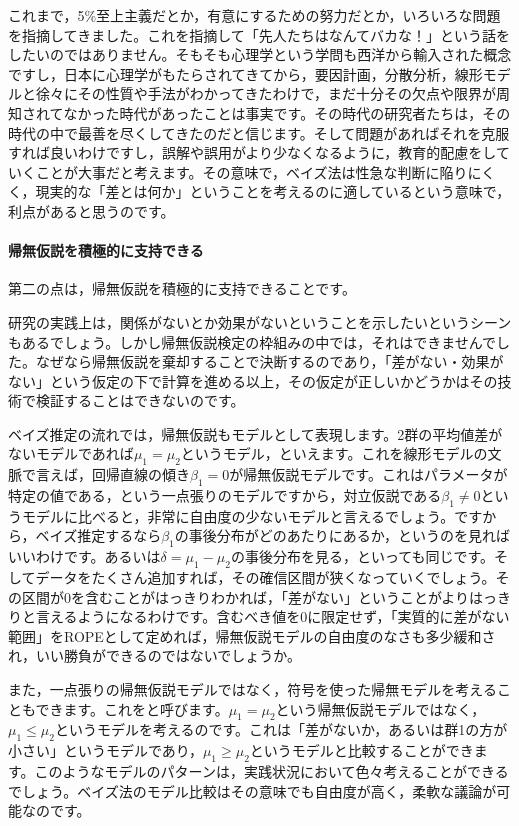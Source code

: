 \documentclass{ltjbook}
\begin{document}
これまで，5\%至上主義だとか，有意にするための努力だとか，いろいろな問題を指摘してきました。これを指摘して「先人たちはなんてバカな！」という話をしたいのではありません。そもそも心理学という学問も西洋から輸入された概念ですし，日本に心理学がもたらされてきてから，要因計画，分散分析，線形モデルと徐々にその性質や手法がわかってきたわけで，まだ十分その欠点や限界が周知されてなかった時代があったことは事実です。その時代の研究者たちは，その時代の中で最善を尽くしてきたのだと信じます。そして問題があればそれを克服すれば良いわけですし，誤解や誤用がより少なくなるように，教育的配慮をしていくことが大事だと考えます。その意味で，ベイズ法は性急な判断に陥りにくく，現実的な「差とは何か」ということを考えるのに適しているという意味で，利点があると思うのです。


\paragraph{帰無仮説を積極的に支持できる}
第二の点は，帰無仮説を積極的に支持できることです。

研究の実践上は，関係がないとか効果がないということを示したいというシーンもあるでしょう。しかし帰無仮説検定の枠組みの中では，それはできませんでした。なぜなら帰無仮説を棄却することで決断するのであり，「差がない・効果がない」という仮定の下で計算を進める以上，その仮定が正しいかどうかはその技術で検証することはできないのです。

ベイズ推定の流れでは，帰無仮説もモデルとして表現します。2群の平均値差がないモデルであれば$\mu_1=\mu_2$というモデル，といえます。これを線形モデルの文脈で言えば，回帰直線の傾き$\beta_1 = 0$が帰無仮説モデルです。これはパラメータが特定の値である，という一点張りのモデルですから，対立仮説である$\beta_1 \neq 0$というモデルに比べると，非常に自由度の少ないモデルと言えるでしょう。ですから，ベイズ推定するなら$\beta_1$の事後分布がどのあたりにあるか，というのを見ればいいわけです。あるいは$\delta = \mu_1 - \mu_2$の事後分布を見る，といっても同じです。そしてデータをたくさん追加すれば，その確信区間が狭くなっていくでしょう。その区間が$0$を含むことがはっきりわかれば，「差がない」ということがよりはっきりと言えるようになるわけです。含むべき値を$0$に限定せず，「実質的に差がない範囲」をROPEとして定めれば，帰無仮説モデルの自由度のなさも多少緩和され，いい勝負ができるのではないでしょうか。

また，一点張りの帰無仮説モデルではなく，符号を使った帰無モデルを考えることもできます。これをと呼びます\parencite{OkadaKensuke2014KJ00009351488}。$\mu_1 = \mu_2$という帰無仮説モデルではなく，$\mu_1 \leq \mu_2$というモデルを考えるのです。これは「差がないか，あるいは群1の方が小さい」というモデルであり，$\mu_1 \geq \mu_2$というモデルと比較することができます。このようなモデルのパターンは，実践状況において色々考えることができるでしょう。ベイズ法のモデル比較はその意味でも自由度が高く，柔軟な議論が可能なのです。
\end{document}
